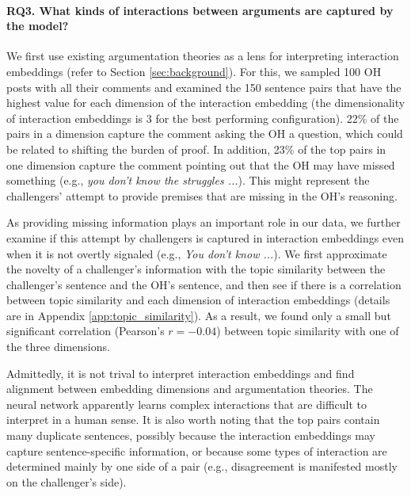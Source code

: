 \documentclass[11pt,a4paper]{article}
\begin{document}
\paragraph{RQ3. What kinds of interactions between arguments are captured by the model?}
We first use existing argumentation theories as a lens for interpreting interaction embeddings (refer to Section \ref{sec:background}). For this, we sampled 100 OH posts with all their comments and examined the 150 sentence pairs that have the highest value for each dimension of the interaction embedding (the dimensionality of interaction embeddings is 3 for the best performing configuration). 22\% of the pairs in a dimension capture the comment asking the OH a question, which could be related to shifting the burden of proof. In addition, 23\% of the top pairs in one dimension capture the comment pointing out that the OH may have missed something (e.g., \emph{you don't know the struggles ...}). This might represent the challengers' attempt to provide premises that are missing in the OH's reasoning.

As providing missing information plays an important role in our data, we further examine if this attempt by challengers is captured in interaction embeddings even when it is not overtly signaled (e.g., \emph{You don't know ...}). We first approximate the novelty of a challenger's information with the topic similarity between the challenger's sentence and the OH's sentence, and then see if there is a correlation between topic similarity and each dimension of interaction embeddings (details are in Appendix \ref{app:topic_similarity}). As a result, we found only a small but significant correlation (Pearson's $r = -0.04$) between topic similarity with one of the three dimensions.

Admittedly, it is not trival to interpret interaction embeddings and find alignment between embedding dimensions and argumentation theories. The neural network apparently learns complex interactions that are difficult to interpret in a human sense. It is also worth noting that the top pairs contain many duplicate sentences, possibly because the interaction embeddings may capture sentence-specific information, or because some types of interaction are determined mainly by one side of a pair (e.g., disagreement is manifested mostly on the challenger's side).
\end{document}
